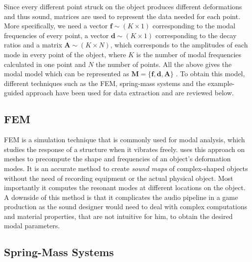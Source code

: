 Since every different point struck on the object produces different deformations and thus sound, matrices are used to represent the data needed for each point. More specifically, we need a vector $\textbf{f}\sim (K \times 1)$  corresponding to the modal frequencies of every point, a vector $\textbf{d}\sim (K \times 1)$ corresponding to the decay ratios and a matrix $\textbf{A}\sim (K \times N)$, which corresponds to the amplitudes of each mode in every point of the object, where $K$ is the number of modal frequencies calculated in one point and $N$ the number of points. All the above gives the modal model which can be represented as $\textbf{M} = \{\textbf{f}, \textbf{d}, \textbf{A}\}$ \cite{van2001foleyautomatic}. To obtain this model, different techniques such as the \gls{FEM}, spring-mass systems and the example-guided approach have been used for data extraction and are reviewed below.


\subsection{FEM}\label{sec:fem}

\gls{FEM} is a simulation technique that is commonly used for modal analysis, which studies the response of a structure when it vibrates freely. \cite{o2002synthesizing} uses this approach on meshes to precompute the shape and frequencies of an object's deformation modes. It is an accurate method to create \textit{sound maps} of complex-shaped objects without the need of recording equipment or the actual physical object. Most importantly it computes the resonant modes at different locations on the object. A downside of this method is that it complicates the audio pipeline in a game production as the sound designer would need to deal with complex computations and material properties, that are not intuitive for him, to obtain the desired modal parameters.

\subsection{Spring-Mass Systems}\label{sec:springmass}

